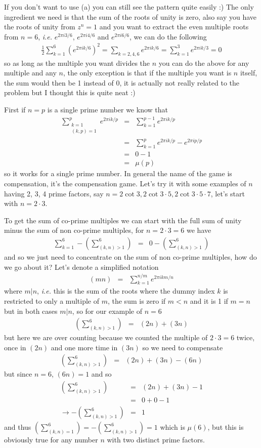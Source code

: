 \documentclass[aps,preprint,preprintnumbers,nofootinbib,showpacs,prd]{revtex4-1}
\newcommand{\ie}{{\it i.e.} }
\newcommand{\nbea}{\begin{eqnarray*}}
\newcommand{\neea}{\end{eqnarray*}}
\begin{document}
If you don't want to use (a) you can still see the pattern quite easily :) The only ingredient we need is that the sum of the roots of unity is zero, also say you have the roots of unity from $z^{n} = 1$ and you want to extract the even multiple roots from $n=6$, \ie $e^{2\pi i 3/6}$, $e^{2\pi i 4/6}$ and $e^{2\pi i 6/6}$, we can do the following
%
\nbea
\frac{1}{2} \sum_{k=1}^6 \left(e^{2\pi i k/6}\right)^2 = \sum_{k=2,4,6} e^{2\pi i k/6} = \sum_{k=1}^3 e^{2\pi i k/3} = 0
\neea
%
so as long as the multiple you want divides the $n$ you can do the above for any multiple and any $n$, the only exception is that if the multiple you want is $n$ itself, the sum would then be 1 instead of 0, it is actually not really related to the problem but I thought this is quite neat :)


First if $n=p$ is a single prime number we know that
%
\nbea
\sum_{\substack{k=1\\(k,p)=1}}^p e^{2\pi i k/p} & = & \sum_{k=1}^{p-1} e^{2\pi i k/p} \\
& = & \sum_{k=1}^{p} e^{2\pi i k/p} - e^{2\pi i p/p} \\
& = & 0 - 1 \\
& = & \mu(p)
\neea
%
so it works for a single prime number. In general the name of the game is compensation, it's the compensation game. Let's try it with some examples of $n$ having 2, 3, 4 prime factors, say $n=2\cot3, 2\cot3\cdot5, 2\cot3\cdot5\cdot7$, let's start with $n = 2\cdot3$.

To get the sum of co-prime multiples we can start with the full sum of unity minus the sum of non co-prime multiples, for $n=2\cdot3=6$ we have
%
\nbea
\sum_{k=1}^6 - \left(\sum_{(k,n) > 1}^6\right) & = & 0 - \left(\sum_{(k,n) > 1}^6\right)
\neea
%
and so we just need to concentrate on the sum of non co-prime multiples, how do we go about it? Let's denote a simplified notation
%
\nbea
(mn) & = & \sum_{k=1}^{n/m} e^{2\pi i km/n}
\neea
%
where $m|n$, \ie this is the sum of the roots where the dummy index $k$ is restricted to only a multiple of $m$, the sum is zero if $m < n$ and it is 1 if $m = n$ but in both cases $m|n$, so for our example of $n=6$
%
\nbea
\left(\sum_{(k,n) > 1}^6\right) & = & (2n) + (3n)
\neea
%
but here we are over counting because we counted the multiple of $2\cdot 3 = 6$ twice, once in $(2n)$ and one more time in $(3n)$ so we need to compensate
%
\nbea
\left(\sum_{(k,n) > 1}^6\right) & = & (2n) + (3n) - (6n)
\neea
%
but since $n=6$, $(6n) = 1$ and so
%
\nbea
\left(\sum_{(k,n) > 1}^6\right) & = & (2n) + (3n) - 1 \\
& = & 0 + 0 - 1 \\
\to -\left(\sum_{(k,n) > 1}^6\right) & = & 1
\neea
%
and thus $\left(\sum_{(k,n) = 1}^6\right) = -\left(\sum_{(k,n) > 1}^6\right) = 1$ which is $\mu(6)$, but this is obviously true for any number $n$ with two distinct prime factors. 
\end{document}
